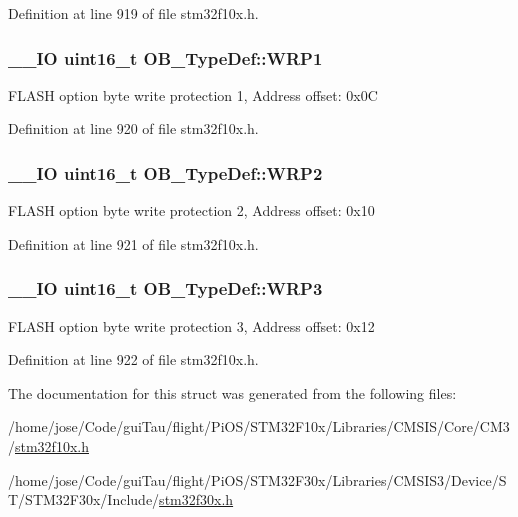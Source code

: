 Definition at line 919 of file stm32f10x.\-h.

\hypertarget{struct_o_b___type_def_ad397993d8c149a64e3f2a8bc7ecdf1c5}{
\subsubsection[{W\-R\-P1}]{\setlength{\rightskip}{0pt plus 5cm}\-\_\-\-\_\-\-I\-O {\bf uint16\-\_\-t} O\-B\-\_\-\-Type\-Def\-::\-W\-R\-P1}}\label{struct_o_b___type_def_ad397993d8c149a64e3f2a8bc7ecdf1c5}
F\-L\-A\-S\-H option byte write protection 1, Address offset\-: 0x0\-C 

Definition at line 920 of file stm32f10x.\-h.

\hypertarget{struct_o_b___type_def_a475b2347222db8e35d7ade1a881ca31c}{
\subsubsection[{W\-R\-P2}]{\setlength{\rightskip}{0pt plus 5cm}\-\_\-\-\_\-\-I\-O {\bf uint16\-\_\-t} O\-B\-\_\-\-Type\-Def\-::\-W\-R\-P2}}\label{struct_o_b___type_def_a475b2347222db8e35d7ade1a881ca31c}
F\-L\-A\-S\-H option byte write protection 2, Address offset\-: 0x10 

Definition at line 921 of file stm32f10x.\-h.

\hypertarget{struct_o_b___type_def_ab8bdaebc42e051ff9911eb88dad75f92}{
\subsubsection[{W\-R\-P3}]{\setlength{\rightskip}{0pt plus 5cm}\-\_\-\-\_\-\-I\-O {\bf uint16\-\_\-t} O\-B\-\_\-\-Type\-Def\-::\-W\-R\-P3}}\label{struct_o_b___type_def_ab8bdaebc42e051ff9911eb88dad75f92}
F\-L\-A\-S\-H option byte write protection 3, Address offset\-: 0x12 

Definition at line 922 of file stm32f10x.\-h.



The documentation for this struct was generated from the following files\-:\begin{DoxyCompactItemize}
\item 
/home/jose/\-Code/gui\-Tau/flight/\-Pi\-O\-S/\-S\-T\-M32\-F10x/\-Libraries/\-C\-M\-S\-I\-S/\-Core/\-C\-M3/\hyperlink{stm32f10x_8h}{stm32f10x.\-h}\item 
/home/jose/\-Code/gui\-Tau/flight/\-Pi\-O\-S/\-S\-T\-M32\-F30x/\-Libraries/\-C\-M\-S\-I\-S3/\-Device/\-S\-T/\-S\-T\-M32\-F30x/\-Include/\hyperlink{stm32f30x_8h}{stm32f30x.\-h}\end{DoxyCompactItemize}
